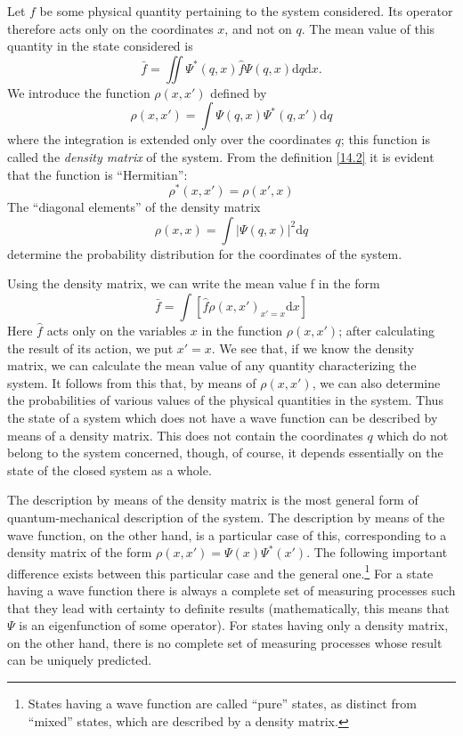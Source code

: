 Let $ f $ be some physical quantity pertaining to the system considered. Its operator therefore acts only on the coordinates $ x $, and not on $ q $. The mean value of this quantity in the state considered is
\begin{equation}\label{14.1}
\bar{f}=\iint\Psi^*(q,x)\hat{f}\Psi(q,x)\mathrm{d}q\mathrm{d}x.
\end{equation}
We introduce the function $ \rho(x, x') $ defined by
\begin{equation}\label{14.2}
\rho(x, x')=\int\Psi(q,x)\Psi^*(q,x')\mathrm{d}q
\end{equation}
where the integration is extended only over the coordinates $ q $; this function is called the \textit{density matrix} of the system. From the definition \eqref{14.2} it is evident that the function is “Hermitian”:
\begin{equation}\label{14.3}
\rho^*(x,x')=\rho(x',x)
\end{equation}
The “diagonal elements” of the density matrix
\[ \rho(x,x)=\int|\Psi(q,x)|^2\mathrm{d}q \]
determine the probability distribution for the coordinates of the system.

Using the density matrix, we can write the mean value f in the form
\begin{equation}\label{14.4}
\bar{f}=\int\left[\hat{f}\rho(x,x')_{x'=x}\mathrm{d}x \right]
\end{equation}
Here $ \hat{f} $ acts only on the variables $ x $ in the function $ \rho(x, x') $; after calculating the result of its action, we put $ x' = x $. We see that, if we know the density matrix, we can calculate the mean value of any quantity characterizing the system. It follows from this that, by means of $ \rho(x, x') $, we can also determine the probabilities of various values of the physical quantities in the system. Thus the state of a system which does not have a wave function can be described by means of a density matrix. This does not contain the coordinates $ q $ which do not belong to the system concerned, though, of course, it depends essentially on the state of the closed system as a whole.

The description by means of the density matrix is the most general form of quantum-mechanical description of the system. The description by means of the wave function, on the other hand, is a particular case of this, corresponding to a density matrix of the form $ \rho(x, x') = \Psi(x)\Psi^*(x') $. The following important difference exists between this particular case and the general one.\footnote{States having a wave function are called “pure” states, as distinct from “mixed” states, which are described by a density matrix.
} For a state having a wave function there is always a complete set of measuring processes such that they lead with certainty to definite results (mathematically, this means that $\Psi$ is an eigenfunction of some operator). For states having only a density matrix, on the other hand, there is no complete set of measuring processes whose result can be uniquely predicted.

